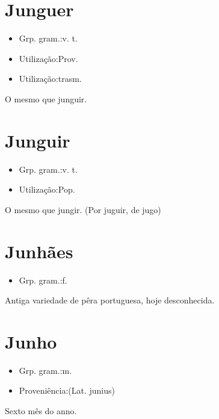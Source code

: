 \documentclass{article}
\begin{document}
\section{Junguer}
\begin{itemize}
\item {Grp. gram.:v. t.}
\end{itemize}
\begin{itemize}
\item {Utilização:Prov.}
\end{itemize}
\begin{itemize}
\item {Utilização:trasm.}
\end{itemize}
O mesmo que \textunderscore junguir\textunderscore .
\section{Junguir}
\begin{itemize}
\item {Grp. gram.:v. t.}
\end{itemize}
\begin{itemize}
\item {Utilização:Pop.}
\end{itemize}
O mesmo que \textunderscore jungir\textunderscore .
(Por \textunderscore juguir\textunderscore , de \textunderscore jugo\textunderscore )
\section{Junhães}
\begin{itemize}
\item {Grp. gram.:f.}
\end{itemize}
Antiga variedade de pêra portuguesa, hoje desconhecida.
\section{Junho}
\begin{itemize}
\item {Grp. gram.:m.}
\end{itemize}
\begin{itemize}
\item {Proveniência:(Lat. \textunderscore junius\textunderscore )}
\end{itemize}
Sexto mês do anno.
\end{document}
